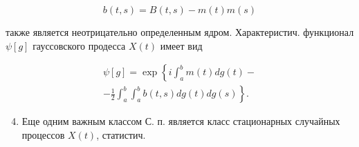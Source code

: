 \documentclass[10pt]{article}
\begin{document}
\[

b(t, s)=B(t, s)-m(t) m(s)

\]



также является неотрицательно определенным ядром. Характеристич. функционал $\psi[g]$ гауссовского продесса $X(t)$ имеет вид



\[

\begin{gathered}

\psi[g]=\exp \left\{i \int_{a}^{b} m(t) d g(t)-\right. \\

\left.-\frac{1}{2} \int_{a}^{b} \int_{a}^{b} b(t, s) d g(t) d g(s)\right\} .

\end{gathered}

\]



\begin{enumerate}

  \setcounter{enumi}{3}

  \item Еще одним важным классом С. п. является класс стационарных случайных процессов $X(t)$, статистич.

\end{enumerate}
\end{document}
